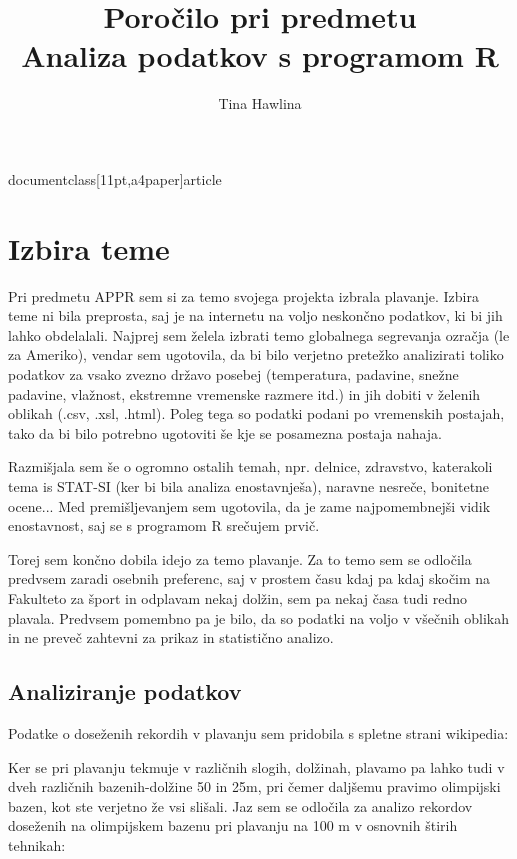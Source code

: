 documentclass[11pt,a4paper]{article}

\usepackage[slovene]{babel}
\usepackage[utf8x]{inputenc}
\usepackage{graphicx}
\usepackage{enumerate}
\usepackage{itemize}
\usepackage{url}

\pagestyle{plain}



\title{Poročilo pri predmetu \\
Analiza podatkov s programom R}
\author{Tina Hawlina}
\maketitle

\section{Izbira teme}


Pri predmetu APPR sem si za temo svojega projekta izbrala plavanje. Izbira teme ni bila preprosta, saj je na internetu na voljo neskončno podatkov, ki bi jih lahko obdelalali. Najprej sem želela izbrati temo globalnega segrevanja ozračja (le za Ameriko), vendar sem ugotovila, da bi bilo verjetno pretežko analizirati toliko podatkov za vsako zvezno državo posebej (temperatura, padavine, snežne padavine, vlažnost, ekstremne vremenske razmere itd.) in jih dobiti v želenih oblikah (.csv, .xsl, .html). Poleg tega so podatki podani po vremenskih postajah, tako da bi bilo potrebno ugotoviti še kje se posamezna postaja nahaja.

Razmišjala sem še o ogromno ostalih temah, npr. delnice, zdravstvo, katerakoli tema is STAT-SI (ker bi bila analiza enostavnješa), naravne nesreče, bonitetne ocene... Med premišljevanjem sem ugotovila, da je zame najpomembnejši vidik enostavnost, saj se s programom R srečujem prvič.

Torej sem končno dobila idejo za temo plavanje. Za to temo sem se odločila predvsem zaradi osebnih preferenc, saj v prostem času kdaj pa kdaj skočim na Fakulteto za šport in odplavam nekaj dolžin, sem pa nekaj časa tudi redno plavala. Predvsem pomembno pa je bilo, da so podatki na voljo v všečnih oblikah in ne preveč zahtevni za prikaz in statistično analizo. 


\subsection{Analiziranje podatkov}

Podatke o doseženih rekordih v plavanju sem pridobila s spletne strani wikipedia:
Ker se pri plavanju tekmuje v različnih slogih, dolžinah, plavamo pa lahko tudi v dveh različnih bazenih-dolžine 50 in 25m, pri čemer daljšemu pravimo olimpijski bazen, kot ste verjetno že vsi slišali. Jaz sem se odločila za analizo rekordov doseženih na olimpijskem bazenu pri plavanju na 100 m  v osnovnih štirih tehnikah:

